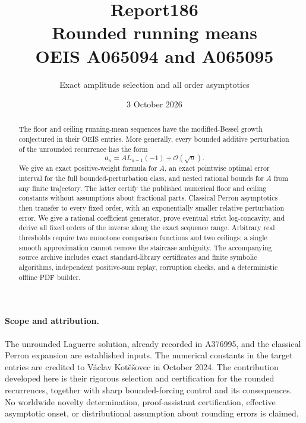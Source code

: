\documentclass[11pt]{article}
\title{Report186\\[5pt]Rounded running means\\[3pt]OEIS A065094 and A065095}
\author{Exact amplitude selection and all order asymptotics}
\date{3 October 2026}
\theoremstyle{remark}\newtheorem{remark}[theorem]{Remark}
\newcommand{\OO}{\mathcal O}
\begin{document}
\maketitle
\begin{abstract}
The floor and ceiling running-mean sequences have the modified-Bessel growth conjectured in their OEIS entries. More generally, every bounded additive perturbation of the unrounded recurrence has the form
\[
 a_n=A L_{n-1}(-1)+\OO(\sqrt n).
\]
We give an exact positive-weight formula for $A$, an exact pointwise optimal error interval for the full bounded-perturbation class, and nested rational bounds for $A$ from any finite trajectory. The latter certify the published numerical floor and ceiling constants without assumptions about fractional parts. Classical Perron asymptotics then transfer to every fixed order, with an exponentially smaller relative perturbation error. We give a rational coefficient generator, prove eventual strict log-concavity, and derive all fixed orders of the inverse along the exact sequence range. Arbitrary real thresholds require two monotone comparison functions and two ceilings; a single smooth approximation cannot remove the staircase ambiguity. The accompanying source archive includes exact standard-library certificates and finite symbolic algorithms, independent positive-sum replay, corruption checks, and a deterministic offline PDF builder.
\end{abstract}

\paragraph{Scope and attribution.}
The unrounded Laguerre solution, already recorded in A376995, and the classical Perron expansion are established inputs. The numerical constants in the target entries are credited to V\'aclav Kot\v e\v sovec in October 2024. The contribution developed here is their rigorous selection and certification for the rounded recurrences, together with sharp bounded-forcing control and its consequences. No worldwide novelty determination, proof-assistant certification, effective asymptotic onset, or distributional assumption about rounding errors is claimed.
\end{document}
